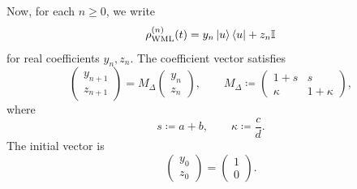 \documentclass[superscriptaddress,amsmath,amssymb,aps,pra,letterpaper,tightenlines,notitlepages,12pt]{revtex4-2}
\begin{document}
Now, for each $n\ge0$, we write 
\begin{equation}
\rho_{\mathrm{WML}}^{(n)}(t)=y_n\ket{u}\bra{u}+z_n\mathbb I
\end{equation}
for real coefficients $y_n,z_n$. The coefficient vector satisfies
\begin{equation}
\begin{pmatrix}
y_{n+1}\\ z_{n+1}
\end{pmatrix}
= M_\Delta
\begin{pmatrix}
y_n\\ z_n
\end{pmatrix},
\qquad
M_\Delta\coloneqq 
\begin{pmatrix}
1+s & s\\[1mm]
\kappa & 1+\kappa
\end{pmatrix},
\label{eq:block_matrix_update}
\end{equation}
where
\begin{equation}
s\coloneqq a+b, \qquad
\kappa\coloneqq \frac{c}{d}.
\end{equation}
The initial vector is
\begin{equation}
\begin{pmatrix}
y_0\\ z_0
\end{pmatrix}
=
\begin{pmatrix}
1\\ 0
\end{pmatrix}.
\end{equation}
\end{document}
